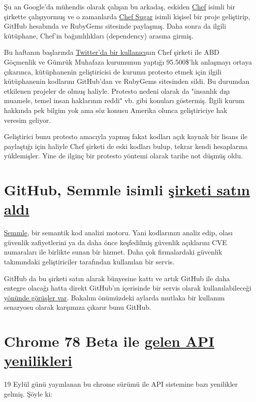 \documentclass[11pt]{article}
\begin{document}
Şu an Google'da mühendis olarak çalışan bu arkadaş, eskiden \href{https://www.chef.io/}{Chef} isimli bir
şirkette çalışıyormuş ve o zamanlarda \href{https://github.com/sethvargo/chef-sugar}{Chef Sugar} isimli kişisel bir proje
geliştirip, GitHub hesabında ve RubyGems sitesinde paylaşmış. Daha sonra da
ilgili kütüphane, Chef'in bağımlılıkları (dependency) arasına girmiş.

Bu haftanın başlarında \href{https://twitter.com/shanley/status/1173692656192385024}{Twitter'da bir kullanıcı}nın Chef şirketi ile ABD
Göçmenlik ve Gümrük Muhafaza kurumunun yaptığı 95.500\$'lık anlaşmayı ortaya
çıkarınca, kütüphanenin geliştiricisi de kurumu protesto etmek için ilgili
kütüphanenin kodlarını GitHub'dan ve RubyGems sitesinden sildi. Bu durumdan
etkilenen projeler de olmuş haliyle. Protesto nedeni olarak da "insanlık dışı
muamele, temel insan haklarının reddi" vb. gibi konuları göstermiş. İlgili
kurum hakkında pek bilgim yok ama söz konusu Amerika olunca geliştiriciye hak
veresim geliyor.

Geliştirici bunu protesto amacıyla yapmış fakat kodları açık kaynak bir lisans
ile paylaştığı için haliyle Chef şirketi de eski kodları bulup, tekrar kendi
hesaplarına yüklemişler. Yine de ilginç bir protesto yöntemi olarak tarihe not
düşmüş oldu.
\section{GitHub, Semmle isimli \href{https://github.blog/2019-09-18-github-welcomes-semmle/}{şirketi satın aldı}}
\label{sec:org5aaae3f}
\href{https://semmle.com/}{Semmle}, bir semantik kod analizi motoru. Yani kodlarınızı analiz edip, olası
güvenlik zafiyetlerini ya da daha önce keşfedilmiş güvenlik açıklarını CVE
numaraları ile birlikte sunan bir hizmet. Daha çok firmalardaki güvenlik
takımındaki geliştiriciler tarafından kullanılan bir servis.

GitHub da bu şirketi satın alarak bünyesine kattı ve artık GitHub ile daha
entegre olacağı hatta direkt GitHub'ın içerisinde bir servis olarak
kullanılabileceği \href{https://venturebeat.com/2019/09/18/github-acquires-semmle-to-help-developers-spot-code-exploits/}{yönünde görüşler var}. Bakalım önümüzdeki aylarda mutlaka bir
kullanım senaryosu olarak karşımıza çıkarır bunu GitHub.
\section{Chrome 78 Beta ile \href{https://blog.chromium.org/2019/09/chrome-78-beta-new-houdini-api-native.html?m=1}{gelen API yenilikleri}}
\label{sec:org01b86fe}
19 Eylül günü yayınlanan bu chrome sürümü ile API sistemine bazı yenilikler
gelmiş. Şöyle ki:
\end{document}
